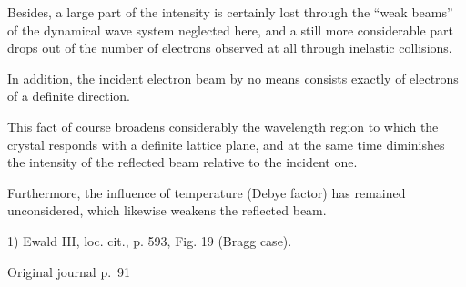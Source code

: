 \documentclass[10pt]{article}
\newcommand{\origpage}[1]{\par\medskip\noindent\hfill{\small\color{notegray}Original journal p.~#1}\hfill\mbox{}\par\smallskip}
\begin{document}
Besides, a large part of the intensity is certainly lost through the “weak beams” of the dynamical wave system neglected here, and a still more considerable part drops out of the number of electrons observed at all through inelastic collisions.\par
In addition, the incident electron beam by no means consists exactly of electrons of a definite direction.\par
This fact of course broadens considerably the wavelength region to which the crystal responds with a definite lattice plane, and at the same time diminishes the intensity of the reflected beam relative to the incident one.\par
Furthermore, the influence of temperature (Debye factor) has remained unconsidered, which likewise weakens the reflected beam.\par
\noindent\footnotesize 1) Ewald III, loc. cit., p. 593, Fig. 19 (Bragg case).\par\normalsize
\origpage{91}
\end{document}
